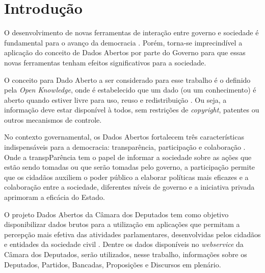 \chapter*[Introdução]{Introdução}

O desenvolvimento de novas ferramentas de interação entre governo e sociedade é fundamental para o avanço da democracia \cite{consegi2011}. Porém, torna-se imprecindível a aplicação do conceito de Dados Abertos por parte do Governo para que essas novas ferramentas tenham efeitos significativos para a sociedade.

O conceito para Dado Aberto a ser considerado para esse trabalho é o definido pela \textit{Open Knowledge}, onde é estabelecido que um dado (ou um conhecimento) é aberto quando estiver livre para uso, reuso e redistribuição \cite{open_knowledge}. Ou seja, a informação deve estar disponível à todos, sem restrições de \textit{copyright}, patentes ou outros mecanismos de controle.

No contexto governamental, os Dados Abertos fortalecem três características indispensáveis para a democracia: transparência, participação e colaboração \cite{consegi2011}. Onde a transpParência tem o papel de informar a sociedade sobre as ações que estão sendo tomadas ou que serão tomadas pelo governo, a participação permite que os cidadãos auxiliem o poder público a elaborar políticas mais eficazes e a colaboração entre a sociedade, diferentes níveis de governo e a iniciativa privada aprimoram a eficácia do Estado.

O projeto Dados Abertos da Câmara dos Deputados tem como objetivo disponibilizar dados brutos para a utilização em aplicações que permitam a percepção mais efetiva das atividades parlamentares, desenvolvidas pelos cidadãos e entidades da sociedade civil \cite{camara_dados_abertos}. Dentre os dados disponíveis no \textit{webservice} da Câmara dos Deputados, serão utilizados, nesse trabalho, informações sobre os Deputados, Partidos, Bancadas, Proposições e Discursos em plenário.